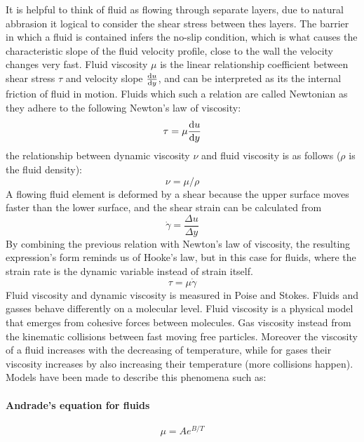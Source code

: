 \begin{multicols}{3}
  It is helpful to think of fluid as flowing through separate layers, due to natural abbrasion it logical to consider
  the shear stress between thes layers.
  The barrier in which a fluid is contained infers the no-slip condition, which is what causes the characteristic slope
  of the fluid velocity profile, close to the wall the velocity changes very fast.
  Fluid viscosity $\mu$ is the linear relationship coefficient between shear stress $\tau$ and velocity slope $\dv{u}{y}$,
  and can be interpreted as its the internal friction of fluid in motion. Fluids which such a relation are called Newtonian
  as they adhere to the following Newton's law of viscosity:
  \begin{equation*}
    \tau  = \mu \dv{u}{y}
  \end{equation*}
  the relationship between dynamic viscosity $\nu$ and fluid viscosity is as follows ($\rho$ is the fluid density):
  \begin{equation*}
    \nu = \mu / \rho
  \end{equation*}
  A flowing fluid element is deformed by a shear because the upper surface moves faster than the lower surface,
  and the shear strain can be calculated from
  \begin{equation*}
    \dot{\gamma} = \frac{\Delta u}{\Delta y}
  \end{equation*}
  By combining the previous relation with Newton's law of viscosity, the resulting expression's form reminds us of
  Hooke's law, but in this case for fluids, where the strain rate is the dynamic variable instead of strain itself.
  \begin{equation*}
    \tau = \mu \dot{\gamma}
  \end{equation*}
  Fluid viscosity and dynamic viscosity is measured in Poise and Stokes.
  Fluids and gasses behave differently on a molecular level. Fluid viscosity is a physical model that emerges from
  cohesive forces between molecules. Gas viscosity instead from the kinematic collisions between fast moving free particles.
  Moreover the viscosity of a fluid increases with the decreasing of temperature, while for gases their viscosity increases
  by also increasing their temperature (more collisions happen). Models have been made to describe this phenomena such as:
  \paragraph{\textbf{Andrade's equation for fluids}}
  \begin{equation*}
    \mu = Ae^{B/T}
  \end{equation*}

\end{multicols}
